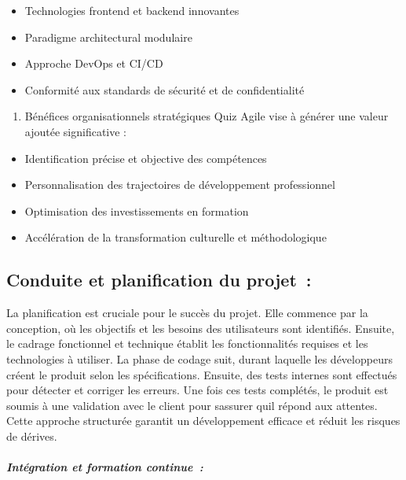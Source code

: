 \documentclass[12pt,a4paper,twoside,openright]{report}
\begin{document}
\begin{itemize}
\item
  Technologies frontend et backend innovantes
\item
  Paradigme architectural modulaire
\item
  Approche DevOps et CI/CD
\item
  Conformité aux standards de sécurité et de confidentialité
\end{itemize}

\begin{enumerate}
\def\labelenumi{\arabic{enumi}.}
\setcounter{enumi}{4}
\item
  Bénéfices organisationnels stratégiques Quiz Agile vise à générer une
  valeur ajoutée significative :
\end{enumerate}

\begin{itemize}
\item
  Identification précise et objective des compétences
\item
  Personnalisation des trajectoires de développement professionnel
\item
  Optimisation des investissements en formation
\item
  Accélération de la transformation culturelle et méthodologique
\end{itemize}

\hypertarget{conduite-et-planification-du-projet}{%
\subsection{Conduite et planification du
projet~:}\label{conduite-et-planification-du-projet}}

La planification est cruciale pour le succès du projet. Elle commence
par la conception, où les objectifs et les besoins des utilisateurs sont
identifiés. Ensuite, le cadrage fonctionnel et technique établit les
fonctionnalités requises et les technologies à utiliser. La phase de
codage suit, durant laquelle les développeurs créent le produit selon
les spécifications. Ensuite, des tests internes sont effectués pour
détecter et corriger les erreurs. Une fois ces tests complétés, le
produit est soumis à une validation avec le client pour
s\textquotesingle assurer qu\textquotesingle il répond aux attentes.
Cette approche structurée garantit un développement efficace et réduit
les risques de dérives.

\hypertarget{intuxe9gration-et-formation-continue}{%
\subparagraph{Intégration et formation
continue~:}\label{intuxe9gration-et-formation-continue}}
\end{document}
